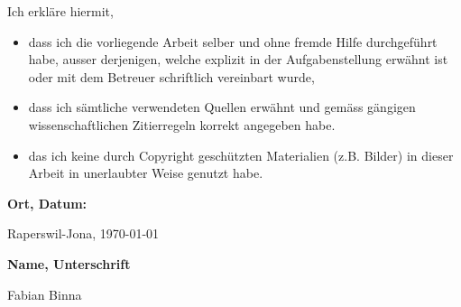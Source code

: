 \newpage
Ich erkläre hiermit,

\begin{itemize}
  \item dass ich die vorliegende Arbeit selber und ohne fremde Hilfe durchgeführt habe, ausser derjenigen, 
  welche explizit in der Aufgabenstellung erwähnt ist oder mit dem Betreuer schriftlich vereinbart wurde,
  \item dass ich sämtliche verwendeten Quellen erwähnt und gemäss gängigen 
  wissenschaftlichen Zitierregeln korrekt angegeben habe.
  \item das ich keine durch Copyright geschützten Materialien (z.B. Bilder) 
  in dieser Arbeit in unerlaubter Weise genutzt habe. 
\end{itemize}

\textbf{Ort, Datum:}

Raperswil-Jona, \today


\textbf{Name, Unterschrift}



Fabian Binna